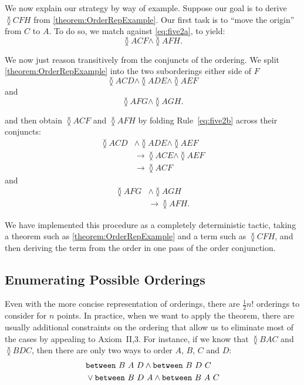 We now explain our strategy by way of example. Suppose our goal is to derive $\between{C}{F}{H}$ from \eqref{theorem:OrderRepExample}. Our first task is to ``move the origin'' from $C$ to $A$. To do so, we match against \eqref{eq:five2a}, to yield:
\begin{displaymath}
\between{A}{C}{F} \wedge \between{A}{F}{H}.
\end{displaymath}

We now just reason transitively from the conjuncts of the ordering. We split \eqref{theorem:OrderRepExample} into the two suborderings either side of $F$
\begin{displaymath}
\between{A}{C}{D} \wedge \between{A}{D}{E} \wedge\between{A}{E}{F}
\end{displaymath}
and
\begin{displaymath}
\between{A}{F}{G}\wedge\between{A}{G}{H}.
\end{displaymath}

and then obtain $\between{A}{C}{F}$ and $\between{A}{F}{H}$ by folding Rule~\eqref{eq:five2b} across their conjuncts:
\begin{align*}
\between{A}{C}{D} &\wedge \between{A}{D}{E} \wedge\between{A}{E}{F}\\
&\longrightarrow \between{A}{C}{E} \wedge \between{A}{E}{F}\\
&\longrightarrow \between{A}{C}{F}
\end{align*}
and
\begin{align*}
\between{A}{F}{G} &\wedge \between{A}{G}{H}\\
&\longrightarrow \between{A}{F}{H}.
\end{align*}

We have implemented this procedure as a completely deterministic tactic, taking a theorem such as \eqref{theorem:OrderRepExample} and a term such as $\between{C}{F}{H}$, and then deriving the term from the order in one pass of the order conjunction.

\subsection{Enumerating Possible Orderings}
Even with the more concise representation of orderings, there are $\frac{1}{2}n!$ orderings to consider for $n$ points. In practice, when we want to apply the theorem, there are usually additional constraints on the ordering that allow us to eliminate most of the cases by appealing to Axiom~II,3. For instance, if we know that $\between{B}{A}{C}$ and $\between{B}{D}{C}$, then there are only two ways to order $A$, $B$, $C$ and $D$:
\begin{align*}
&\texttt{between}\ B\ A\ D\wedge\texttt{between}\ B\ D\ C\\
&\vee\texttt{between}\ B\ D\ A\wedge\texttt{between}\ B\ A\ C
\end{align*}

